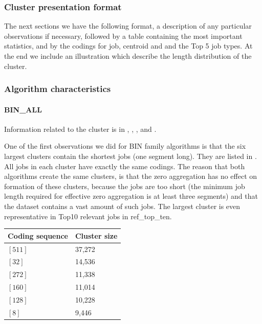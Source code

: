 \documentclass[]{llncs}
\begin{document}
\subsubsection{Cluster presentation format}

The next sections we have the following format, a description of any particular observations if necessary, followed by a table containing the most important statistics, and by the codings for job, centroid and and the Top 5 job types.
At the end we include an illustration which describe the length distribution of the cluster.


\subsubsection{Algorithm characteristics}
\paragraph{BIN\_ALL}
Information related to the cluster is in , , , and .

One of the first observations we did for BIN family algorithms is that the six largest clusters contain the shortest jobs (one segment long).
They are listed in .
All jobs in each cluster have exactly the same codings.
The reason that both algorithms create the same clusters, is that the zero aggregation has no effect on formation of these clusters, because the jobs are too short (the minimum job length required for effective zero aggregation is at least three segments) and that the dataset contains a vast amount of such jobs.
The largest cluster is even representative in Top10 relevant jobs in ref\_top\_ten.

\begingroup
  \centering
  \begin{tabular}{ll}
    Coding sequence & Cluster size \\
    \hline
    $[511]$ & 37,272 \\ 
    $[32]$  & 14,536 \\ 
    $[272]$ & 11,338 \\ 
    $[160]$ & 11,014 \\ 
    $[128]$ & 10,228 \\ 
    $[8]$   & 9,446  \\ 
  \end{tabular}
  \label{tab:bin:largest_clusters}
\endgroup
\end{document}
